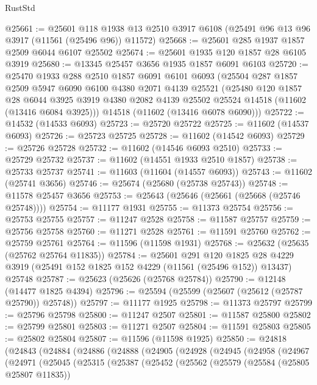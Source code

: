 \begin{lexlean}{RustStd}
\begin{coremodule}
@25661 := @25601
    @118
    @1938
    @13
    @2510
    @3917
    @6108
    (@25491 @96 @13 @96 @3917 (@11561 (@25496 @96)) @11572)
@25668 := @25601 @285 @1937 @1857 @2509 @6044 @6107 @25502
@25674 := @25601 @1935 @120 @1857 @28 @6105 @3919
@25680 := @13345 @25457 @3656 @1935 @1857 @6091 @6103
@25720 := @25470
    @1933
    @288
    @2510
    @1857
    @6091
    @6101
    @6093
    (@25504
      @287
      @1857
      @2509
      @5947
      @6090
      @6100
      @4380
      @2071
      @4139
      @25521
      (@25480
        @120
        @1857
        @28
        @6044
        @3925
        @3919
        @4380
        @2082
        @4139
        @25502
        @25524
        @14518
        (@11602 (@13416 @6084 @3925)))
      @14518
      (@11602 (@13416 @6078 @6090)))
@25722 := @14532 (@14533 @6093)
@25723 := @25720 @25722
@25725 := @11602 (@14537 @6093)
@25726 := @25723 @25725
@25728 := @11602 (@14542 @6093)
@25729 := @25726 @25728
@25732 := @11602 (@14546 @6093 @2510)
@25733 := @25729 @25732
@25737 := @11602 (@14551 @1933 @2510 @1857)
@25738 := @25733 @25737
@25741 := @11603 (@11604 (@14557 @6093))
@25743 := @11602 (@25741 @3656)
@25746 := @25674 (@25680 (@25738 @25743))
@25748 := @11578 @25457 @3656
@25753 := @25643 (@25646 (@25661 (@25668 (@25746 @25748))))
@25754 := @11177 @1931
@25755 := @11373 @25754
@25756 := @25753 @25755
@25757 := @11247 @2528
@25758 := @11587 @25757
@25759 := @25756 @25758
@25760 := @11271 @2528
@25761 := @11591 @25760
@25762 := @25759 @25761
@25764 := @11596 (@11598 @1931)
@25768 := @25632 (@25635 (@25762 @25764 @11835))
@25784 := @25601
    @291
    @120
    @1825
    @28
    @4229
    @3919
    (@25491 @152 @1825 @152 @4229 (@11561 (@25496 @152)) @13437)
    @25748
@25787 := @25623 (@25626 (@25768 @25784))
@25790 := @12148 (@14477 @1825 @4394)
@25796 := @25594 (@25599 (@25607 (@25612 (@25787 @25790)) @25748))
@25797 := @11177 @1925
@25798 := @11373 @25797
@25799 := @25796 @25798
@25800 := @11247 @2507
@25801 := @11587 @25800
@25802 := @25799 @25801
@25803 := @11271 @2507
@25804 := @11591 @25803
@25805 := @25802 @25804
@25807 := @11596 (@11598 @1925)
@25850 := @24818
    (@24843
      (@24884
        (@24886
          (@24888
            (@24905
              (@24928
                (@24945
                  (@24958
                    (@24967
                      (@24971
                        (@25045
                          (@25315
                            (@25387
                              (@25452
                                (@25562
                                  (@25579
                                    (@25584 (@25805 @25807 @11835))

\end{coremodule}
\end{lexlean}
